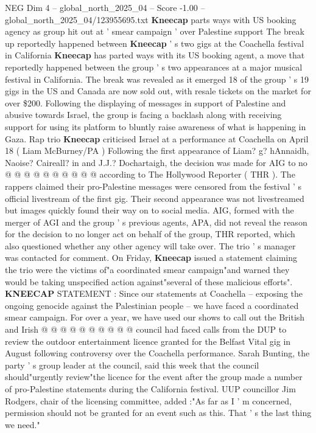 \begin{textsample}{NEG Dim 4 – global\_north\_2025\_04 – Score -1.00 – global\_north\_2025\_04/123955695.txt}  \label{ex:f4_neg_242}
\textbf{Kneecap} parts ways with US booking agency as group hit out at ' smear campaign ' over Palestine support The break up reportedly happened between \textbf{Kneecap} ' s two gigs at the Coachella festival in California \textbf{Kneecap} has parted ways with its US booking agent, a move that reportedly happened between the group ' s two appearances at a major musical festival in California.
The break was revealed as it emerged 18 of the group ' s 19 gigs in the US and Canada are now sold out, with resale tickets on the market for over \$200.
Following the displaying of messages in support of Palestine and abusive towards Israel, the group is facing a backlash along with receiving support for using its platform to bluntly raise awareness of what is happening in Gaza.
Rap trio \textbf{Kneecap} criticised Israel at a performance at Coachella on April 18 ( Liam McBurney/PA ) Following the first appearance of Liam? g? hAnnaidh, Naoise?
Caireall? in and J.J.?
Dochartaigh, the decision was made for AIG to no @ @ @ @ @ @ @ @ @ @ according to The Hollywood Reporter ( THR ).
The rappers claimed their pro-Palestine messages were censored from the festival ' s official livestream of the first gig.
Their second appearance was not livestreamed but images quickly found their way on to social media.
AIG, formed with the merger of AGI and the group ' s previous agents, APA, did not reveal the reason for the decision to no longer act on behalf of the group, THR reported, which also questioned whether any other agency will take over.
The trio ' s manager was contacted for comment.
On Friday, \textbf{Kneecap} issued a statement claiming the trio were the victims of"a coordinated smear campaign"and warned they would be taking unspecified action against"several of these malicious efforts". \textbf{KNEECAP} STATEMENT : Since our statements at Coachella -- exposing the ongoing genocide against the Palestinian people -- we have faced a coordinated smear campaign.
For over a year, we have used our shows to call out the British and Irish @ @ @ @ @ @ @ @ @ @ council had faced calls from the DUP to review the outdoor entertainment licence granted for the Belfast Vital gig in August following controversy over the Coachella performance.
Sarah Bunting, the party ' s group leader at the council, said this week that the council should"urgently review"the licence for the event after the group made a number of pro-Palestine statements during the California festival.
UUP councillor Jim Rodgers, chair of the licensing committee, added :"As far as I ' m concerned, permission should not be granted for an event such as this.
That ' s the last thing we need."

\end{textsample}
